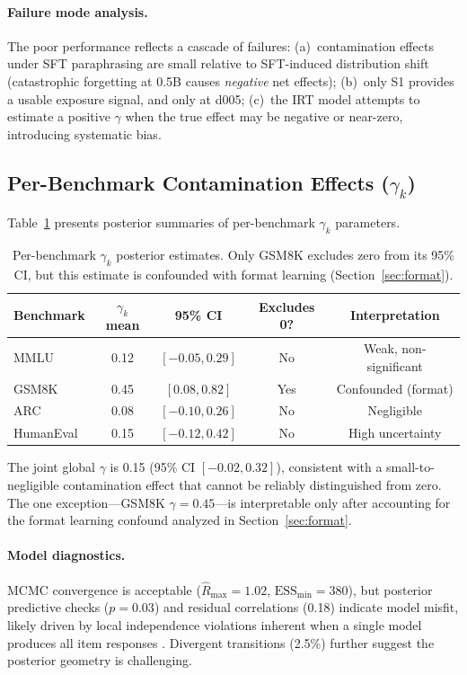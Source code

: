 \documentclass[11pt]{article}
\begin{document}
\paragraph{Failure mode analysis.}
The poor performance reflects a cascade of failures: (a)~contamination effects under SFT paraphrasing are small relative to SFT-induced distribution shift (catastrophic forgetting at 0.5B causes \emph{negative} net effects); (b)~only S1 provides a usable exposure signal, and only at d005; (c)~the IRT model attempts to estimate a positive $\gamma$ when the true effect may be negative or near-zero, introducing systematic bias.

\subsection{Per-Benchmark Contamination Effects ($\gamma_k$)}

Table~\ref{tab:gamma} presents posterior summaries of per-benchmark $\gamma_k$ parameters.

\begin{table}[t]
\centering
\caption{Per-benchmark $\gamma_k$ posterior estimates.
Only GSM8K excludes zero from its 95\% CI, but this estimate is confounded with format learning (Section~\ref{sec:format}).}
\label{tab:gamma}
\small
\begin{tabular}{lcccc}
\toprule
Benchmark & $\gamma_k$ mean & 95\% CI & Excludes 0? & Interpretation \\
\midrule
MMLU & 0.12 & $[-0.05, 0.29]$ & No & Weak, non-significant \\
GSM8K & 0.45 & $[0.08, 0.82]$ & Yes & Confounded (format) \\
ARC & 0.08 & $[-0.10, 0.26]$ & No & Negligible \\
HumanEval & 0.15 & $[-0.12, 0.42]$ & No & High uncertainty \\
\bottomrule
\end{tabular}
\end{table}

The joint global $\gamma$ is 0.15 (95\% CI $[-0.02, 0.32]$), consistent with a small-to-negligible contamination effect that cannot be reliably distinguished from zero.
The one exception---GSM8K $\gamma = 0.45$---is interpretable only after accounting for the format learning confound analyzed in Section~\ref{sec:format}.

\paragraph{Model diagnostics.}
MCMC convergence is acceptable ($\hat{R}_{\max} = 1.02$, $\text{ESS}_{\min} = 380$), but posterior predictive checks ($p = 0.03$) and residual correlations (0.18) indicate model misfit, likely driven by local independence violations inherent when a single model produces all item responses \citep{mislevy1986bayes}.
Divergent transitions (2.5\%) further suggest the posterior geometry is challenging.
\end{document}
